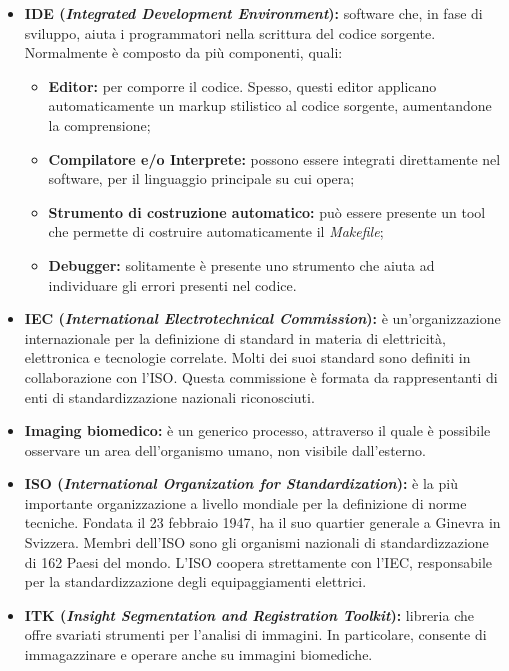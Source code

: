 \begin{itemize}
\item\textbf{IDE (\textit{Integrated Development Environment}):} software che, in fase di sviluppo, aiuta i programmatori nella scrittura del codice sorgente. Normalmente è composto da più componenti, quali:
\begin{itemize}
\item\textbf{Editor:} per comporre il codice. Spesso, questi editor applicano automaticamente un markup stilistico al codice sorgente, aumentandone la comprensione;
\item\textbf{Compilatore e/o Interprete:} possono essere integrati direttamente nel software, per il linguaggio principale su cui opera;
\item\textbf{Strumento di costruzione automatico:} può essere presente un tool che permette di costruire automaticamente il \textit{Makefile};
\item\textbf{Debugger:} solitamente è presente uno strumento che aiuta ad individuare gli errori presenti nel codice.
\end{itemize}

\item\textbf{IEC (\textit{International Electrotechnical Commission}):} è un'organizzazione internazionale per la definizione di standard in materia di elettricità, elettronica e tecnologie correlate. Molti dei suoi standard sono definiti in collaborazione con l'ISO\glossario{}. Questa commissione è formata da rappresentanti di enti di standardizzazione nazionali riconosciuti.

\item\textbf{Imaging biomedico:} è un generico processo, attraverso il quale è possibile osservare un area dell'organismo umano, non visibile dall'esterno.

\item\textbf{ISO (\textit{International Organization for Standardization}):} è la più importante organizzazione a livello mondiale per la definizione di norme tecniche. Fondata il 23 febbraio 1947, ha il suo quartier generale a Ginevra in Svizzera. Membri dell'ISO sono gli organismi nazionali di standardizzazione di 162 Paesi del mondo. L'ISO coopera strettamente con l'IEC\glossario{}, responsabile per la standardizzazione degli equipaggiamenti elettrici.

\item \textbf{ITK (\textit{Insight Segmentation and Registration Toolkit}):} libreria che offre svariati strumenti per l'analisi di immagini. In particolare, consente di immagazzinare e operare anche su immagini biomediche.
\end{itemize}
\pagebreak

